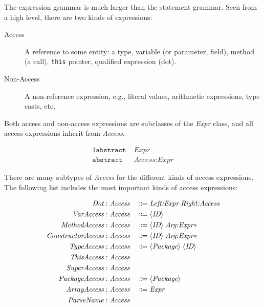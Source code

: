 \documentclass[10pt, twoside, openright]{book}
\begin{document}
The expression grammar is much larger than the statement grammar. Seen from a high level, there are
two kinds of expressions:

\begin{description}
  \item[Access] A reference to some entity: a type, variable (or parameter, field), method (a call),
    \verb'this' pointer, qualified expression (dot).
  \item[Non-Access] A non-reference expression, e.g., literal values, arithmetic expressions,
    type casts, etc.
\end{description}

Both access and non-access expressions are subclasses of the \emph{Expr} class,
and all access expressions inherit from \emph{Access}.

\begin{alignat*}{1}
\texttt{abstract} & \; \textit{Expr} \\
\texttt{abstract} & \; \textit{Access} : \textit{Expr}
\end{alignat*}

\noindent
There are many subtypes of \emph{Access} for the different kinds of access expressions.
The following list includes the most important kinds of access expressions:

\begin{alignat*}{3}
\textit{Dot} : & \; \textit{Access} & \; \Coloneqq & \; \textit{Left:Expr}\;\textit{Right:Access} \\
\textit{VarAccess} : & \; \textit{Access} & \; \Coloneqq & \; \langle\textit{\textit{ID}}\rangle \\
\textit{MethodAccess} : & \; \textit{Access} & \; \Coloneqq & \; \langle\textit{\textit{ID}}\rangle\;\textit{Arg:Expr}\ast \\
\textit{ConstructorAccess} : & \; \textit{Access} & \; \Coloneqq & \; \langle\textit{\textit{ID}}\rangle\;\textit{Arg:Expr}\ast \\
\textit{TypeAccess} : & \; \textit{Access} & \; \Coloneqq & \; \langle\textit{\textit{Package}}\rangle\;\langle\textit{\textit{ID}}\rangle \\
\textit{ThisAccess} : & \; \textit{Access} & & \\
\textit{SuperAccess} : & \; \textit{Access} & & \\
\textit{PackageAccess} : & \; \textit{Access} & \; \Coloneqq & \; \langle\textit{\textit{Package}}\rangle \\
\textit{ArrayAccess} : & \; \textit{Access} & \; \Coloneqq & \; \textit{Expr} \\
\textit{ParseName} : & \; \textit{Access} & &
\end{alignat*}
\end{document}

